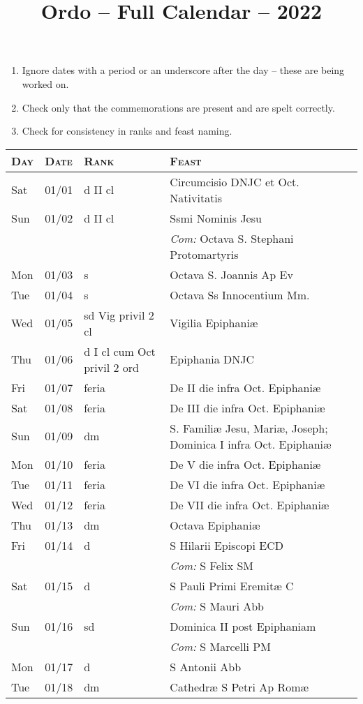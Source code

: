 \documentclass[10pt]{article}
\title{Ordo -- Full Calendar -- 2022}
\begin{document}
\begin{enumerate}
    \item Ignore dates with a period or an underscore after the day -- these are being worked on.
    \item Check only that the commemorations are present and are spelt correctly.
    \item Check for consistency in ranks and feast naming.
\end{enumerate}
\begin{longtable}{ l l l l }
\hline
\textsc{Day} & \textsc{Date} & \textsc{Rank} & \textsc{Feast} \\
\hline
\endhead
Sat & 01/01 & d II cl & Circumcisio DNJC et Oct. Nativitatis\\
Sun & 01/02 & d II cl & Ssmi Nominis Jesu\\
 & & & \textit{Com:} Octava S. Stephani Protomartyris\\
Mon & 01/03 & s & Octava S. Joannis Ap Ev\\
Tue & 01/04 & s & Octava Ss Innocentium Mm.\\
Wed & 01/05 & sd Vig privil 2 cl & Vigilia Epiphaniæ\\
Thu & 01/06 & d I cl cum Oct privil 2 ord & Epiphania DNJC\\
Fri & 01/07 & feria & De II die infra Oct. Epiphaniæ\\
Sat & 01/08 & feria & De III die infra Oct. Epiphaniæ\\
Sun & 01/09 & dm & S. Familiæ Jesu, Mariæ, Joseph; Dominica I infra Oct. Epiphaniæ\\
Mon & 01/10 & feria & De V die infra Oct. Epiphaniæ\\
Tue & 01/11 & feria & De VI die infra Oct. Epiphaniæ\\
Wed & 01/12 & feria & De VII die infra Oct. Epiphaniæ\\
Thu & 01/13 & dm & Octava Epiphaniæ\\
Fri & 01/14 & d & S Hilarii Episcopi ECD\\
 & & & \textit{Com:} S Felix SM\\
Sat & 01/15 & d & S Pauli Primi Eremitæ C\\
 & & & \textit{Com:} S Mauri Abb\\
Sun & 01/16 & sd & Dominica II post Epiphaniam\\
 & & & \textit{Com:} S Marcelli PM\\
Mon & 01/17 & d & S Antonii Abb\\
Tue & 01/18 & dm & Cathedræ S Petri Ap Romæ\\

\end{longtable}
\end{document}
